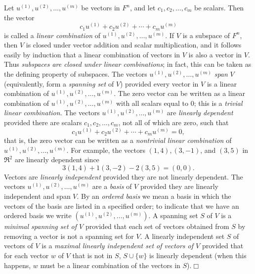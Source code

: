 \begin{definition}\label{1def:linearcomb}{\rm
Let $u^{(1)},u^{(2)},\ldots,u^{(m)}$ be vectors in $F^n$, and let
$c_1,c_2,\ldots,c_m$ be scalars. Then the vector
\[c_1u^{(1)}+c_2u^{(2)}+\cdots+c_mu^{(m)}\]
is called a {\it linear combination}  of $u^{(1)},u^{(2)},\ldots,u^{(m)}$.
If $V$ is a subspace of $F^n$, then $V$ is closed under vector addition and
scalar multiplication, and it follows easily by induction that a
linear combination of vectors in $V$ is also a vector in $V$. Thus
{\it subspaces
are closed under linear combinations}; in fact, this can be taken as the
defining property of subspaces.
The vectors $u^{(1)},u^{(2)},\ldots,u^{(m)}$ {\it span} $V$ 
(equivalently, form a {\it spanning set} of $V$) provided every vector in
$V$
is a linear combination of $u^{(1)},u^{(2)},\ldots,u^{(m)}$. The zero
vector can be written as a linear combination of
$u^{(1)},u^{(2)},\ldots,u^{(m)}$ with all scalars equal to 0; this is a
{\it trivial linear combination}. The vectors
$u^{(1)},u^{(2)},\ldots,u^{(m)}$ are {\it linearly dependent} provided
there are scalars $c_1,c_2,\ldots,c_m$, not all of which are zero, such
that
\[c_1u^{(1)}+c_2u^{(2)}+\cdots+c_mu^{(m)}=0,\]
that is, the zero vector can be written as a {\it nontrivial linear 
combination} of $u^{(1)},u^{(2)},\ldots,u^{(m)}$.
For example, the vectors $(1,4), (3,-1)$, and $(3,5)$ in $\Re^2$ are
linearly
dependent since
\[3(1,4)+1(3,-2)-2(3,5)=(0,0).\] Vectors are {\it linearly independent} provided  they are not linearly dependent.
The vectors
$u^{(1)},u^{(2)},\ldots,u^{(m)}$ are a {\it basis}  of $V$ provided they are
linearly independent and span $V$.
By an {\it ordered basis}  we mean a basis in which the vectors of the basis are listed
in a specified order; to indicate that we have an ordered basis we write
$(u^{(1)},u^{(2)},\ldots,u^{(m)})$.
A spanning set $S$ of $V$ is a  {\it minimal spanning set of $V$} provided that
each set
of vectors obtained from $S$ by removing a vector is not a spanning set
for $V$.
A linearly independent set $S$ of vectors of $V$ is a {\it maximal linearly 
independent set of vectors of $V$} provided that for each vector $w$ of
$V$ that
is not in $S$, $S\cup\{w\}$ is  linearly dependent (when this happens,
$w$ must be  a linear combination of the vectors in
$S$).\hfill{$\Box$}
}\end{definition}

